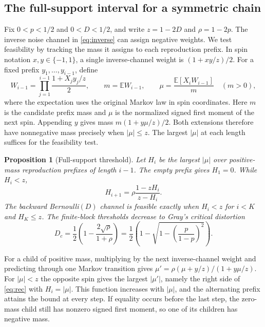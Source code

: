 \documentclass[11pt,letterpaper]{article}
\newtheorem{proposition}[theorem]{Proposition}
\theoremstyle{definition}
\newcommand{\E}{\mathbb E}
\begin{document}
\subsection{The full-support interval for a symmetric chain}
Fix $0<p<1/2$ and $0<D<1/2$, and write $z=1-2D$ and $\rho=1-2p$. The inverse noise channel in \eqref{eq:inverse} can assign negative weights. We test feasibility by tracking the mass it assigns to each reproduction prefix. In spin notation $x,y\in\{-1,1\}$, a single inverse-channel weight is $(1+xy/z)/2$. For a fixed prefix $y_1,\ldots,y_{i-1}$, define
\[
 W_{i-1}=\prod_{j=1}^{i-1}\frac{1+X_j y_j/z}{2},\qquad
 m=\E W_{i-1},\qquad \mu=\frac{\E[X_i W_{i-1}]}{m}\quad(m>0),
\]
where the expectation uses the original Markov law in spin coordinates. Here $m$ is the candidate prefix mass and $\mu$ is the normalized signed first moment of the next spin. Appending $y$ gives mass $m(1+y\mu/z)/2$. Both extensions therefore have nonnegative mass precisely when $|\mu|\le z$. The largest $|\mu|$ at each length suffices for the feasibility test.
\begin{proposition}[Full-support threshold]\label{prop:rec}
Let $H_i$ be the largest $|\mu|$ over positive-mass reproduction prefixes of length $i-1$. The empty prefix gives $H_1=0$. While $H_i<z$,
\begin{equation}
 H_{i+1}=\rho\frac{1-zH_i}{z-H_i}.                             \label{eq:rec}
\end{equation}
The backward Bernoulli$(D)$ channel is feasible exactly when $H_i<z$ for $i<K$ and $H_K\le z$. The finite-block thresholds decrease to Gray's critical distortion \cite{gray70,jalali}
\begin{equation}
 D_c=\frac12\left(1-\frac{2\sqrt\rho}{1+\rho}\right)
     =\frac12\left(1-\sqrt{1-\left(\frac p{1-p}\right)^2}\right).
                                                                    \label{eq:Dc}
\end{equation}
\end{proposition}
For a child of positive mass, multiplying by the next inverse-channel weight and predicting through one Markov transition gives $\mu'=\rho(\mu+y/z)/(1+y\mu/z)$. For $|\mu|<z$ the opposite spin gives the largest $|\mu'|$, namely the right side of \eqref{eq:rec} with $H_i=|\mu|$. This function increases with $|\mu|$, and the alternating prefix attains the bound at every step. If equality occurs before the last step, the zero-mass child still has nonzero signed first moment, so one of its children has negative mass.
\end{document}
